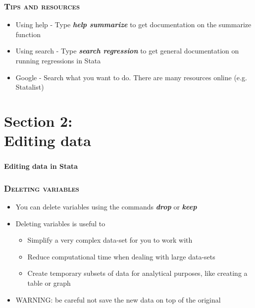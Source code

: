 \documentclass[10pt]{beamer}
\begin{document}
	\begin{frame}
		\frametitle{\textsc{Tips and resources}}
		\begin{itemize}
			\item Using help - Type \textbf{\textit{help summarize}} to get documentation on the summarize function
			\item Using search - Type \textbf{\textit{search regression}} to get general documentation on running regressions in Stata
			\item Google - Search what you want to do. There are many resources online (e.g. Statalist)
			
		\end{itemize}
	\end{frame}
			 
\section{Section 2: \\ Editing data}

	\begin{frame}
		\frametitle{\textsc{}}

		\begin{center}
			\Large \textbf{Editing data in Stata}
		\end{center}
	\end{frame}

	\begin{frame}
		\frametitle{\textsc{Deleting variables}}

		\begin{itemize}
			\item You can delete variables using the commands \textbf{\textit{drop}} 
				  or \textbf{\textit{keep}}
			\item Deleting variables is useful to
			\begin{itemize}
				\item Simplify a very complex data-set for you to work with	
				\item Reduce computational time when dealing with large data-sets
				\item Create temporary subsets of data for analytical purposes, like creating a table or graph
			\end{itemize}
			\item WARNING: be careful not save the new data on top of the original
		\end{itemize}
	\end{frame}
\end{document}
